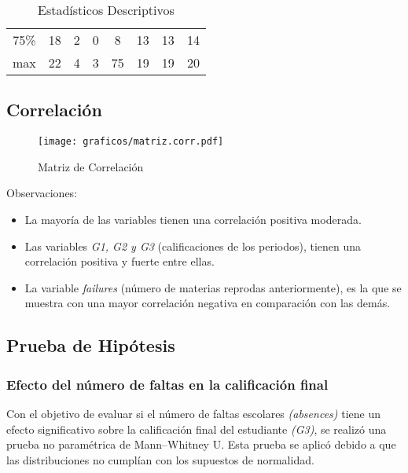 \documentclass{article}
\begin{document}
\begin{table}[H]
\begin{tabular}{cccccccc}
\rowcolor[HTML]{FFFFFF} 
75\%  & 18                                   & 2                                          & 0                                         & 8                                         & 13                                  & 13                                  & 14                                  \\
\rowcolor[HTML]{EFEFEF} 
max   & 22                                   & 4                                          & 3                                         & 75                                        & 19                                  & 19                                  & 20                                 
\end{tabular}
\caption{Estadísticos Descriptivos}
\label{tab:estadisticos_descriptivos}
\end{table}

\subsection*{Correlación}
\begin{figure}[H]
    \centering
    \texttt{[image: graficos/matriz.corr.pdf]}
    \caption{\small Matriz de Correlación}
    \label{fig:correlacion}
\end{figure}

Observaciones: 
\begin{itemize}[label=\textendash]
    \item La mayoría de las variables tienen una correlación positiva moderada.
    \item Las variables \textit{G1, G2 y G3} (calificaciones de los periodos), tienen una correlación positiva y fuerte entre ellas.
    \item La variable \textit{failures} (número de materias reprodas anteriormente), es la que se muestra con una mayor correlación negativa en comparación con las demás.
\end{itemize}

\subsection*{Prueba de Hipótesis}

\subsubsection*{Efecto del número de faltas en la calificación final}

Con el objetivo de evaluar si el número de faltas escolares \textit{(absences)} tiene un efecto significativo sobre la calificación final del estudiante \textit{(G3)}, se realizó una prueba no paramétrica de Mann–Whitney U. Esta prueba se aplicó debido a que las distribuciones no cumplían con los supuestos de normalidad.
\end{document}

